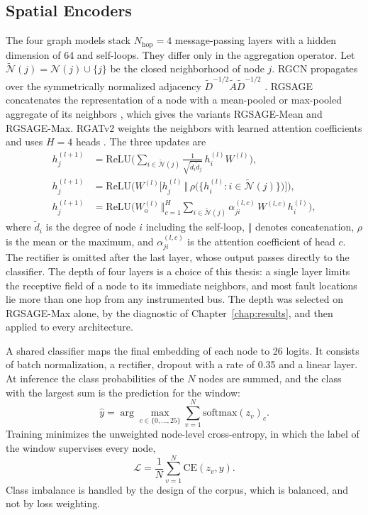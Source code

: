 \documentclass[MTech]{ugthesis}
\begin{document}
\subsection{Spatial Encoders}

The four graph models stack $N_{\mathrm{hop}}=4$ message-passing layers with a hidden dimension of 64 and self-loops. They differ only in the aggregation operator. Let $\tilde{\mathcal{N}}(j)=\mathcal{N}(j)\cup\{j\}$ be the closed neighborhood of node $j$. RGCN propagates over the symmetrically normalized adjacency $\tilde{D}^{-1/2}\tilde{A}\tilde{D}^{-1/2}$ \citep{kipf2016}. RGSAGE concatenates the representation of a node with a mean-pooled or max-pooled aggregate of its neighbors \citep{hamilton2017}, which gives the variants RGSAGE-Mean and RGSAGE-Max. RGATv2 weights the neighbors with learned attention coefficients and uses $H=4$ heads \citep{brody2022}. The three updates are
\begin{align}
h_j^{(l+1)}&=\mathrm{ReLU}\Big(\textstyle\sum_{i\in\tilde{\mathcal{N}}(j)}\tfrac{1}{\sqrt{\tilde d_i\tilde d_j}}\,h_i^{(l)}W^{(l)}\Big), \label{eq:gcn}\\
h_j^{(l+1)}&=\mathrm{ReLU}\Big(W^{(l)}\big[h_j^{(l)}\,\Vert\,\rho\big(\{h_i^{(l)}:i\in\tilde{\mathcal{N}}(j)\}\big)\big]\Big), \label{eq:sage}\\
h_j^{(l+1)}&=\mathrm{ReLU}\Big(W_{\mathrm{o}}^{(l)}\,\Big\Vert_{c=1}^{H}\sum_{i\in\tilde{\mathcal{N}}(j)}\alpha_{ji}^{(l,c)}\,W^{(l,c)}h_i^{(l)}\Big), \label{eq:gat}
\end{align}
where $\tilde d_i$ is the degree of node $i$ including the self-loop, $\Vert$ denotes concatenation, $\rho$ is the mean or the maximum, and $\alpha_{ji}^{(l,c)}$ is the attention coefficient of head $c$. The rectifier is omitted after the last layer, whose output passes directly to the classifier. The depth of four layers is a choice of this thesis: a single layer limits the receptive field of a node to its immediate neighbors, and most fault locations lie more than one hop from any instrumented bus. The depth was selected on RGSAGE-Max alone, by the diagnostic of Chapter~\ref{chap:results}, and then applied to every architecture.

A shared classifier maps the final embedding of each node to 26 logits. It consists of batch normalization, a rectifier, dropout with a rate of 0.35 and a linear layer. At inference the class probabilities of the $N$ nodes are summed, and the class with the largest sum is the prediction for the window:
\begin{equation}
\hat{y}=\arg\max_{c\in\{0,\dots,25\}}\sum_{v=1}^{N}\mathrm{softmax}(z_v)_c .
\label{eq:softvote}
\end{equation}
Training minimizes the unweighted node-level cross-entropy, in which the label of the window supervises every node,
\begin{equation}
\mathcal{L}=\frac{1}{N}\sum_{v=1}^{N}\mathrm{CE}(z_v,y).
\label{eq:loss}
\end{equation}
Class imbalance is handled by the design of the corpus, which is balanced, and not by loss weighting.
\end{document}
